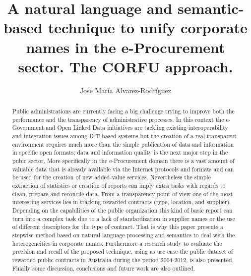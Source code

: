 \documentclass{llncs}
\begin{document}
\title{A natural language and semantic-based technique to unify corporate names in the e-Procurement sector. The CORFU approach.}

\titlerunning{}

\author{Jose Mar\'{i}a Alvarez-Rodr\'{i}guez} 







\date{}

\maketitle

\renewcommand{\labelitemi}{$\bullet$}

\begin{abstract}
Public administrations are currently facing a big challenge trying to improve both the performance and the transparency of administrative processes.
In this context the e-Government and Open Linked Data initiatives are tackling existing interoperability and 
integration issues among ICT-based systems but the creation of a real transparent environment requires 
much more than the simple publication of data and information in specific open formats; data and information 
quality is the next major step in the pubic sector. More specifically in the e-Procurement domain there is a 
vast amount of valuable data that is already available via the Internet protocols and formats and can be used 
for the creation of new added-value services. Nevertheless the simple extraction of statistics or creation of reports 
can imply extra tasks with regards to clean, prepare and reconcile data. 
From a transparency point of view one of the most interesting services lies in tracking rewarded contracts (type, location, and supplier). 
Depending on the capabilities of the public organization this kind of basic report can turn into a 
complex task due to a lack of standardization in supplier names or the use of different descriptors for the type of contract. That is why 
this paper presents a stepwise method based on natural language processing and semantics to deal with the heterogeneities in corporate names. 
Furthermore a research study to evaluate the precision and recall of the proposed technique, using as use case the public dataset of rewarded public 
contracts in Australia during the period 2004-2012, is also presented. Finally some discussion, 
conclusions and future work are also outlined.
\end{abstract}
\end{document}
